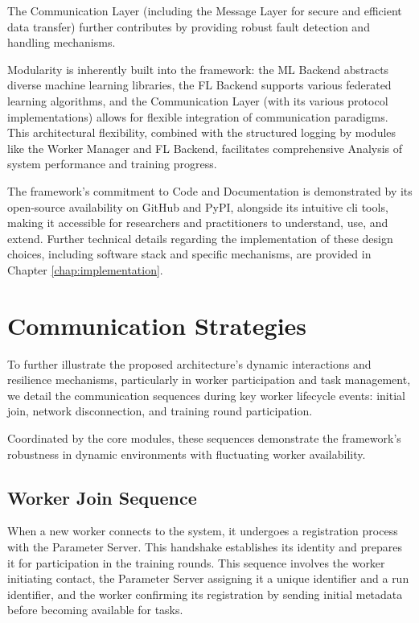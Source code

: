 The Communication Layer (including the Message Layer for secure and efficient data transfer) further contributes by providing robust fault detection and handling mechanisms. 

Modularity is inherently built into the framework: the ML Backend abstracts diverse machine learning libraries, the FL Backend supports various federated learning algorithms, and the Communication Layer (with its various protocol implementations) allows for flexible integration of communication paradigms. This architectural flexibility, combined with the structured logging by modules like the Worker Manager and FL Backend, facilitates comprehensive Analysis of system performance and training progress. 

The framework's commitment to Code and Documentation is demonstrated by its open-source availability on GitHub and PyPI, alongside its intuitive \ac{cli} tools, making it accessible for researchers and practitioners to understand, use, and extend. Further technical details regarding the implementation of these design choices, including software stack and specific mechanisms, are provided in Chapter \ref{chap:implementation}. 

\section{Communication Strategies}

To further illustrate the proposed architecture's dynamic interactions and resilience mechanisms, particularly in worker participation and task management, we detail the communication sequences during key worker lifecycle events: initial join, network disconnection, and training round participation.

Coordinated by the core modules, these sequences demonstrate the framework's robustness in dynamic environments with fluctuating worker availability.

\subsection{Worker Join Sequence}

When a new worker connects to the system, it undergoes a registration process with the Parameter Server. This handshake establishes its identity and prepares it for participation in the training rounds. This sequence involves the worker initiating contact, the Parameter Server assigning it a unique identifier and a run identifier, and the worker confirming its registration by sending initial metadata before becoming available for tasks. 

